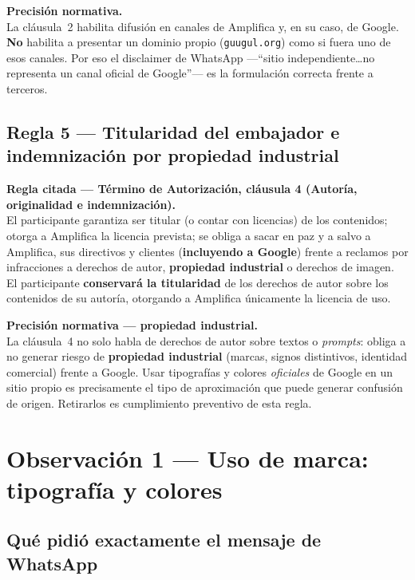 \documentclass[11pt,a4paper]{article}
\newcommand{\regla}[2]{%
  \begin{reglabox}
  \noindent\textbf{Regla citada --- #1.}\\[0.35em]
  \small #2
  \end{reglabox}
}
\begin{document}
\begin{riesgobox}
\noindent\textbf{Precisión normativa.}\\[0.3em]
La cláusula~2 habilita difusión en canales de Amplifica y, en su caso, de Google. \textbf{No} habilita a presentar un dominio propio (\texttt{guugul.org}) como si fuera uno de esos canales. Por eso el disclaimer de WhatsApp ---\enquote{sitio independiente\ldots no representa un canal oficial de Google}--- es la formulación correcta frente a terceros.
\end{riesgobox}

\subsection{Regla 5 --- Titularidad del embajador e indemnización por propiedad industrial}

\regla{Término de Autorización, cláusula 4 (Autoría, originalidad e indemnización)}{%
El participante garantiza ser titular (o contar con licencias) de los contenidos; otorga a Amplifica la licencia prevista; se obliga a sacar en paz y a salvo a Amplifica, sus directivos y clientes (\textbf{incluyendo a Google}) frente a reclamos por infracciones a derechos de autor, \textbf{propiedad industrial} o derechos de imagen.\\[0.4em]
El participante \textbf{conservará la titularidad} de los derechos de autor sobre los contenidos de su autoría, otorgando a Amplifica únicamente la licencia de uso.}

\begin{riesgobox}
\noindent\textbf{Precisión normativa --- propiedad industrial.}\\[0.3em]
La cláusula~4 no solo habla de derechos de autor sobre textos o \emph{prompts}: obliga a no generar riesgo de \textbf{propiedad industrial} (marcas, signos distintivos, identidad comercial) frente a Google. Usar tipografías y colores \emph{oficiales} de Google en un sitio propio es precisamente el tipo de aproximación que puede generar confusión de origen. Retirarlos es cumplimiento preventivo de esta regla.
\end{riesgobox}

\section{Observación 1 --- Uso de marca: tipografía y colores}

\subsection{Qué pidió exactamente el mensaje de WhatsApp}
\end{document}

